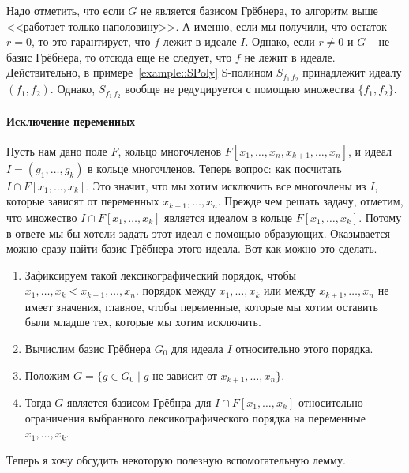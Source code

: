Надо отметить, что если $G$ не является базисом Грёбнера, то алгоритм выше <<работает только наполовину>>.
А именно, если мы получили, что остаток $r = 0$, то это гарантирует, что $f$ лежит в идеале $I$.
Однако, если $r \neq 0$ и $G$ -- не базис Грёбнера, то отсюда еще не следует, что $f$ не лежит в идеале.
Действительно, в примере~\ref{example::SPoly} S-полином $S_{f_1\,f_2}$ принадлежит идеалу $(f_1, f_2)$.
Однако, $S_{f_1\,f_2}$ вообще не редуцируется с помощью множества $\{f_1,f_2\}$.

\paragraph{Исключение переменных}

Пусть нам дано поле $F$, кольцо многочленов $F[x_1,\ldots,x_n, x_{k+1}, \ldots, x_n]$, и идеал $I = (g_1,\ldots,g_k)$ в кольце многочленов.
Теперь вопрос: как посчитать $I\cap F[x_1,\ldots,x_k]$.
Это значит, что мы хотим исключить все многочлены из $I$, которые зависят от переменных $x_{k+1},\ldots,x_n$.
Прежде чем решать задачу, отметим, что множество  $I\cap F[x_1,\ldots,x_k]$ является идеалом в кольце $F[x_1,\ldots,x_k]$.
Потому в ответе мы бы хотели задать этот идеал с помощью образующих.
Оказывается можно сразу найти базис Грёбнера этого идеала.
Вот как можно это сделать.
\begin{enumerate}
\item  Зафиксируем такой лексикографический порядок, чтобы $x_1,\ldots,x_k < x_{k+1},\ldots,x_n$.
порядок между $x_1,\ldots,x_k$ или между $x_{k+1},\ldots,x_n$ не имеет значения, главное, чтобы переменные, которые мы хотим оставить были младше тех, которые мы хотим исключить.

\item Вычислим базис Грёбнера $G_0$ для идеала $I$ относительно этого порядка.

\item Положим $G = \{g\in G_0\mid g \text{ не зависит от } x_{k+1},\ldots,x_n\}$.

\item Тогда $G$ является базисом Грёбнра для $I\cap F[x_1,\ldots,x_k]$ относительно ограничения выбранного лексикографического порядка на переменные $x_1,\ldots,x_k$.
\end{enumerate}

Теперь я хочу обсудить некоторую полезную вспомогательную лемму.


